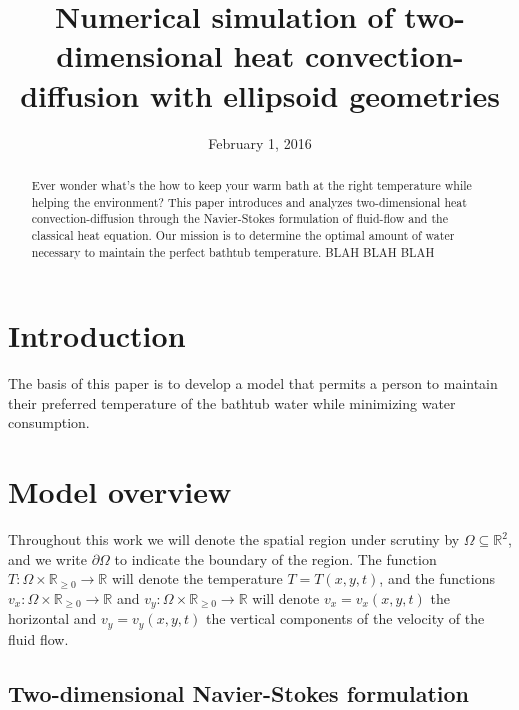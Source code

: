\documentclass[12pt]{amsart}
\title{Numerical simulation of two-dimensional heat convection-diffusion with
ellipsoid geometries}
\date{February 1, 2016}
\newcommand{\R}{\mathbb{R}}
\begin{document}
\maketitle

\thispagestyle{fancy}
\tableofcontents

\begin{abstract}
    Ever wonder what's the how to keep your warm bath at the right temperature
    while helping the environment? This paper introduces and analyzes
    two-dimensional heat convection-diffusion through the Navier-Stokes
    formulation of fluid-flow and the classical heat equation. Our mission is to
    determine the optimal amount of water necessary to maintain the perfect
    bathtub temperature. BLAH BLAH BLAH
\end{abstract}

\section{Introduction}

The basis of this paper is to develop a model that permits a person to maintain their preferred temperature of the bathtub water while minimizing water consumption.    

\section{Model overview}

Throughout this work we will denote the spatial region under scrutiny by
$\Omega \subseteq \R^2$, and we write $\partial \Omega$ to indicate the
boundary of the region. The function $T : \Omega \times \R_{\geq 0} \to \R$
will denote the temperature $T = T(x,y,t)$, and the functions $v_x : \Omega
\times \R_{\geq 0} \to \R$ and $v_y : \Omega \times \R_{\geq 0} \to \R$ will
denote $v_x = v_x(x,y,t)$ the horizontal and $v_y = v_y(x,y,t)$ the vertical
components of the velocity of the fluid flow. 

\subsection{Two-dimensional Navier-Stokes formulation}
\end{document}

